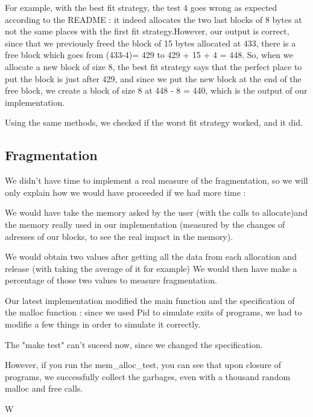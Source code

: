 \documentclass[a4paper,10pt]{article}
\begin{document}
For example, with the best fit strategy, the test 4 goes wrong as expected according to the README : it indeed allocates the two last blocks of 8 bytes at not the same places with the first fit strategy.However, our output is correct, since that we previously freed the block of 15 bytes allocated at 433, there is a free block which goes from (433-4)= 429 to 429 + 15 + 4 = 448. So, when we allocate a new block of size 8, the best fit strategy says that the perfect place to put the block is just after 429, and since we put the new block at the end of the free block, we create a block of size 8 at 448 - 8 = 440, which is the output of our implementation.

Using the same methods, we checked if the worst fit strategy worked, and it did.

\subsection{Fragmentation}

We didn't have time to implement a real measure of the fragmentation, so we will only explain how we would have proceeded if we had more time :

We would have take the memory asked by the user (with the calls to allocate)and the memory really used in our implementation (measured by the changes of adresses of our blocks, to see the real impact in the memory).

We would obtain two values after getting all the data from each allocation and release (with taking the average of it for example)
We would then have make  a percentage of those two values to measure fragmentation.

Our latest implementation modified the main function and the specification of the malloc function : since we used Pid to simulate exits of programs, we had to modifie a few things in order to simulate it correctly.

The "make test" can't suceed now, since we changed the specification.

However, if you run the mem\_alloc\_test, you can see that upon closure of programs, we successfully collect the garbages, even with a thousand random malloc and free calls.

W




 
\end{document}
